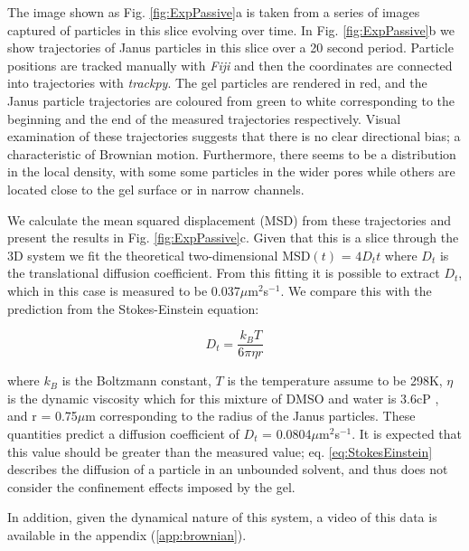The image shown as Fig. \ref{fig:ExpPassive}a is taken from a series of images captured of particles in this slice evolving over time. In Fig. \ref{fig:ExpPassive}b we show trajectories of Janus particles in this slice over a 20 second period. Particle positions are tracked manually with \textit{Fiji} and then the coordinates are connected into trajectories with \textit{trackpy}. The gel particles are rendered in red, and the Janus particle trajectories are coloured from green to white corresponding to the beginning and the end of the measured trajectories respectively. Visual examination of these trajectories suggests that there is no clear directional bias; a characteristic of Brownian motion. Furthermore, there seems to be a distribution in the local density, with some some particles in the wider pores while others are located close to the gel surface or in narrow channels.

We calculate the mean squared displacement (MSD) from these trajectories and present the results in Fig. \ref{fig:ExpPassive}c. Given that this is a slice through the 3D system we fit the theoretical two-dimensional MSD$(t)$ = $4D_t t$  where $D_t$ is the translational diffusion coefficient. From this fitting it is possible to extract $D_t$, which in this case is measured to be 0.037$\mu$m$^2$s$^{-1}$. We compare this with the prediction from the Stokes-Einstein equation:

\begin{equation}
	D_t = \frac{k_B T}{6 \pi \eta r}
	\label{eq:StokesEinstein}
\end{equation} 

\noindent where $k_B$ is the Boltzmann constant, $T$ is the temperature assume to be 298K, $\eta$ is the dynamic viscosity which for this mixture of DMSO and water is 3.6cP \cite{catalan2001}, and r = 0.75$\mu$m corresponding to the radius of the Janus particles. These quantities predict a diffusion coefficient of $D_t$ = 0.0804$\mu$m$^2$s$^{-1}$. It is expected that this value should be greater than the measured value; eq. \ref{eq:StokesEinstein} describes the diffusion of a particle in an unbounded solvent, and thus does not consider the confinement effects imposed by the gel. 

In addition, given the dynamical nature of this system, a video of this data is available in the appendix (\ref{app:brownian}).


